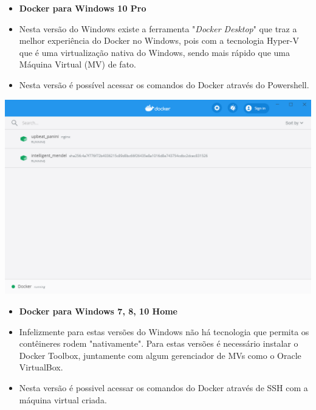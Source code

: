 \documentclass[10pt]{beamer}
\theoremstyle{remark}
\theoremstyle{definition}
\begin{document}
\begin{frame}[allowframebreaks]
	\framebreak
	
	\begin{itemize}
		\item \textbf{Docker para Windows 10 Pro}
		
		\item Nesta versão do Windows existe a ferramenta "\textit{Docker Desktop}" que traz a melhor experiência do Docker no Windows, pois com a tecnologia Hyper-V que é uma virtualização nativa do Windows, sendo mais rápido que uma Máquina Virtual (MV) de fato.
		
		\item Nesta versão é possível acessar os comandos do Docker através do Powershell.
	\end{itemize}
	
	\framebreak
	
	\includegraphics[width=1\textwidth]{images/10.png}
	
	\framebreak
	
	\begin{itemize}
		\item \textbf{Docker para Windows 7, 8, 10 Home}
		
		\item Infelizmente para estas versões do Windows não há tecnologia que permita os contêineres rodem "nativamente". Para estas versões é necessário instalar o Docker Toolbox, juntamente com algum gerenciador de MVs como o Oracle VirtualBox.
		
		\item Nesta versão é possivel acessar os comandos do Docker através de SSH com a máquina virtual criada.
	\end{itemize}
	
	\framebreak
	

\end{frame}
\end{document}
